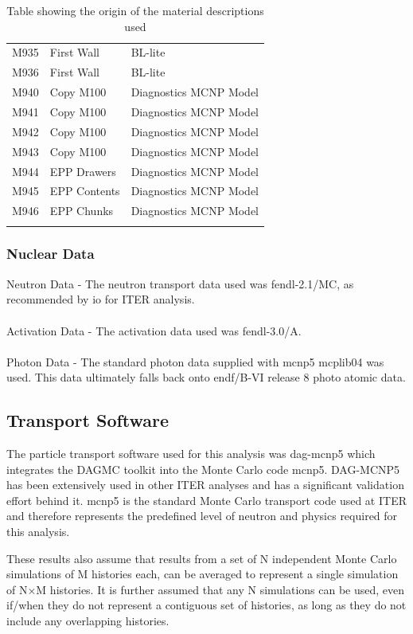 \documentclass[12pt]{article}
\begin{document}
\begin{centering}
\begin{longtable}[ht!]{ p{} | p{} | p{} }
  M935 & First Wall & BL-lite \\
  M936 & First Wall & BL-lite \\
  M940 & Copy M100 & Diagnostics MCNP Model \\
  M941 & Copy M100 & Diagnostics MCNP Model \\
  M942 & Copy M100 & Diagnostics MCNP Model \\
  M943 & Copy M100 & Diagnostics MCNP Model \\
  M944 & EPP Drawers & Diagnostics MCNP Model \\
  M945 & EPP Contents & Diagnostics MCNP Model \\
  M946 & EPP Chunks & Diagnostics MCNP Model \\
 \caption{Table showing the origin of the material descriptions used}
 \label{tab:material_origin}
 \end{longtable}
\end{centering}

\subsubsection*{Nuclear Data}
Neutron Data - The neutron transport data used was \gls{fendl}-2.1/MC, as 
recommended by \gls{io} for ITER analysis. 
\\
\\
Activation Data - The activation data used was \gls{fendl}-3.0/A.
\\
\\
Photon Data - The standard photon data supplied with \gls{mcnp5} mcplib04 was 
used. This data ultimately falls back onto \gls{endf}/B-VI release 8 photo
atomic data.

\subsection{Transport Software}
The particle transport software used for this analysis was \gls{dag}-\gls{mcnp5}
which integrates the DAGMC toolkit into the Monte Carlo code \gls{mcnp5}. 
DAG-MCNP5 has been extensively used in other ITER analyses and has a significant
validation effort behind it. \gls{mcnp5} is the standard Monte Carlo transport code
used at ITER and therefore represents the predefined level of neutron and physics
required for this analysis.

These results also assume that results from a set of N independent Monte Carlo
simulations of M histories each, can be averaged to represent a single
simulation of N$\times$M histories.  It is further assumed that any N
simulations can be used, even if/when they do not represent a contiguous set
of histories, as long as they do not include any overlapping histories.
\end{document}
